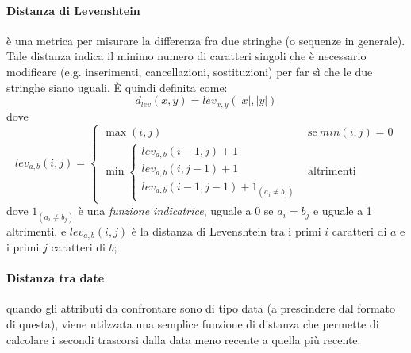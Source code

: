 \paragraph{Distanza di Levenshtein} è una metrica per misurare la differenza fra due stringhe (o sequenze in generale). Tale distanza indica il minimo numero di caratteri singoli che è necessario modificare (e.g. inserimenti, cancellazioni, sostituzioni) per far sì che le due stringhe siano uguali. È quindi definita come:
\begin{equation}
	d_{lev}(x,y) = lev_{x,y}(|x|,|y|)
\end{equation}
dove 
$$lev_{a,b}(i,j) = 
\begin{cases}
	\max(i,j) & \text{se}\ min(i,j) = 0 \\
    \min{ 
    	\begin{cases}
    		lev_{a,b}(i-1,j) + 1 \\
           	lev_{a,b}(i,j-1) + 1 \\
            lev_{a,b}(i-1,j-1) + 1_{(a_i \neq b_j)}
    	\end{cases}} & \text{altrimenti}
\end{cases}
$$
dove $1_{(a_i \neq b_j)}$ è una \textit{funzione indicatrice}, uguale a 0 se $a_i = b_j$ e uguale a 1 altrimenti, e $lev_{a,b}(i,j)$ è la distanza di Levenshtein  tra i primi $i$ caratteri di $a$ e i primi $j$ caratteri di $b$;
\paragraph{Distanza tra date} quando gli attributi da confrontare sono di tipo data (a prescindere dal formato di questa), viene utilzzata una semplice funzione di distanza che permette di calcolare i secondi trascorsi dalla data meno recente a quella più recente. 
